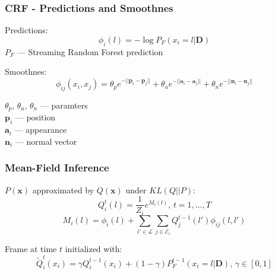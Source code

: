 \documentclass[mathserif, 10pt]{beamer}
\begin{document}
\begin{frame}
\frametitle{CRF - Predictions and Smoothnes}

  Predictions:
  \begin{equation}
  \phi_i(l) = -\log P_F(x_i = l | \mathbf{D})
  \end{equation}
  $P_F$ --- Streaming Random Forest prediction

  \vspace{0.5cm}
  Smoothnes:
  \begin{equation}
      \phi_{ij}(x_i, x_j)  = \theta_p e^{-||\mathbf{p}_i - \mathbf{p}_j||}  + \theta_a e^{-||\mathbf{a}_i - \mathbf{a}_j||} + \theta_n e^{-||\mathbf{n}_i - \mathbf{n}_j||}
  \end{equation}
  
  $\theta_p$, $\theta_a$, $\theta_n$ --- paramters \\
  $\mathbf{p}_i$ --- position\\
  $\mathbf{a}_i$ --- appearance\\
  $\mathbf{n}_i$ --- normal vector
  
  
\end{frame}

\begin{frame}
\frametitle{Mean-Field Inference}
$P(\mathbf{x})$ approximated by $Q(\mathbf{x})$ under $KL(Q||P)$:
\begin{equation}
 Q_i^t(l) = \frac{1}{Z_i}e^{M_i(l)} \text{, } t = 1, \ldots, T
\end{equation}
\begin{equation}
 M_i(l) = \phi_i(l) + \sum_{l' \in \mathcal{L}} \sum_{j \in \mathcal{E}_i} Q_j^{t-1}(l')\phi_{ij}(l, l')
\end{equation}


Frame at time $t$ initialized with:
\begin{equation}
 \widetilde{Q}_i^t(x_i) = \gamma Q_i^{t-1}(x_i) + (1 - \gamma) P_F^{t-1}(x_i = l | \mathbf{D}) \text{, } \gamma \in [0, 1]
\end{equation}

\end{frame}
\end{document}
